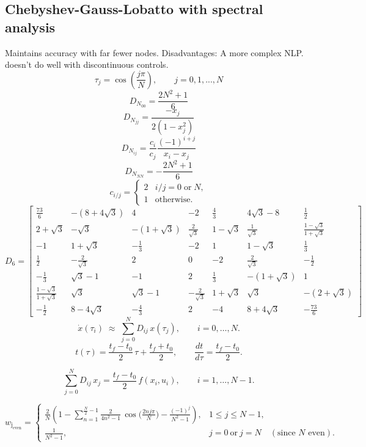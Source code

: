 \documentclass[]{article}
\begin{document}
\subsection*{Chebyshev-Gauss-Lobatto with spectral analysis}
Maintains accuracy with far fewer nodes.  Disadvantages: A more complex NLP. doesn't do well with discontinuous controls.
	\[
        \tau_j = \cos{(\frac{j\pi}{N})},\qquad j = 0,1,...,N
        \]
	\[
       D_{N_{00}}=\frac{2N^2+1}{6}
        \]
	\[
       D_{N_{jj}}=\frac{-x_j}{2(1-x_j^2)}
        \]
	\[
       D_{N_{ij}}=\frac{c_i}{c_j}\frac{(-1)^{i+j}}{x_i-x_j}
        \]
	\[
       D_{N_{NN}}=-\frac{2N^2+1}{6}
        \]
	\[
        c_{i/j}=
        \begin{cases}
        2 & i/j = 0 \;\text{or}\; N, \\
        1 & \text{otherwise}.
        \end{cases}
        \]
        \[
        D_{6} =
        \begin{bmatrix}
        \frac{73}{6} & -(8+4\sqrt{3})  & 4 & -2 & \frac{4}{3} & 4\sqrt{3} - 8 & \frac{1}{2}\\
        2+\sqrt{3} & -\sqrt{3} & -(1+\sqrt{3}) & \frac{2}{\sqrt{3}} & 1-\sqrt{3} & \frac{1}{\sqrt{3}} & \frac{1-\sqrt{3}}{1+\sqrt{3}}\\
        -1 & 1+\sqrt{3} & -\frac{1}{3} & -2 & 1 & 1-\sqrt{3} & \frac{1}{3}\\
        \frac{1}{2} & -\frac{2}{\sqrt{3}} & 2 & 0 & -2 & \frac{2}{\sqrt{3}} & -\frac{1}{2}\\
        -\frac{1}{3} & \sqrt{3}-1 & -1 & 2 & \frac{1}{3} & -(1+\sqrt{3}) & 1\\
        \frac{1-\sqrt{3}}{1+\sqrt{3}} & \sqrt{3} & \sqrt{3}-1 & -\frac{2}{\sqrt{3}} & 1+\sqrt{3} & \sqrt{3} &-( 2+\sqrt{3})\\
        -\frac{1}{2} & 8-4\sqrt{3} & -\frac{4}{3} & 2 & -4 & 8+4\sqrt{3} &  -\frac{73}{6}
        \end{bmatrix}
        \]
        \[
        \dot{x}(\tau_i) \;\approx\; \sum_{j=0}^N D_{ij}\,x(\tau_j), 
        \qquad i=0,\dots,N.
        \]
        \[
        t(\tau) = \frac{t_f-t_0}{2}\,\tau + \frac{t_f+t_0}{2}, 
        \qquad 
        \frac{dt}{d\tau} = \frac{t_f-t_0}{2}.
        \]
        
        \[
        \sum_{j=0}^N D_{ij}\,x_j 
        = \frac{t_f-t_0}{2}\, f(x_i,u_i), 
        \qquad i=1,\dots,N-1.
        \]
        

        \[
        w_{\mathrm{j_{even}}} =
        \begin{cases}
        \displaystyle
        \frac{2}{N}\!\left(
        1 - \sum_{n=1}^{\frac{N}{2}-1} \frac{2}{4n^{2}-1}\,
        \cos\!\Big(\tfrac{2 n j \pi}{N}\Big)
        -\frac{(-1)^{j}}{N^{2}-1}
        \right), & 1 \le j \le N-1, \\[2.0ex]
        \displaystyle \frac{1}{N^{2}-1}, & j=0\ \text{or}\ j=N \quad(\text{since \(N\) even}).
        \end{cases}
        \]
\end{document}
